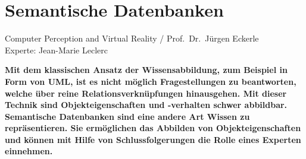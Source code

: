 \documentclass[
    paper=a4,               %
    fontsize=10pt,          %
    open=right,             %
    titlepage=false,        %
    parskip=half,           %
]{scrreprt}                 %
\begin{document}
    \chapter*{Semantische Datenbanken}

    Computer Perception and Virtual Reality / Prof.\ Dr.\ Jürgen Eckerle\\
    Experte: Jean-Marie Leclerc

    \textbf{Mit dem klassischen Ansatz der Wissensabbildung, zum Beispiel in Form von UML, ist es nicht möglich Fragestellungen zu beantworten, welche über reine Relationsverknüpfungen hinausgehen. Mit dieser Technik sind Objekteigenschaften und -verhalten schwer abbildbar. Semantische Datenbanken sind eine andere Art Wissen zu repräsentieren. Sie ermöglichen das Abbilden von Objekteigenschaften und können mit Hilfe von Schlussfolgerungen die Rolle eines Experten einnehmen.}
\end{document}
